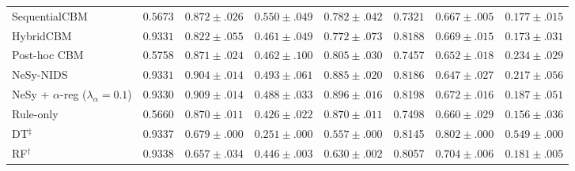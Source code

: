 \documentclass[journal]{IEEEtran}
\begin{document}
\begin{table}[!t]
\begin{tabular}{lccccccc}
SequentialCBM
  & $0.5673$ & $0.872{\pm}.026$ & $\mathbf{0.550{\pm}.049}$ & $0.782{\pm}.042$
  & $0.7321$ & $0.667{\pm}.005$ & $0.177{\pm}.015$ \\
HybridCBM
  & $0.9331$ & $0.822{\pm}.055$ & $0.461{\pm}.049$ & $0.772{\pm}.073$
  & $0.8188$ & $0.669{\pm}.015$ & $0.173{\pm}.031$ \\
Post-hoc CBM
  & 0.5758 & $0.871{\pm}.024$ & $0.462{\pm}.100$ & $0.805{\pm}.030$
  & 0.7457 & $0.652{\pm}.018$ & $0.234{\pm}.029$ \\
\midrule
NeSy-NIDS
  & $0.9331$ & $0.904{\pm}.014$ & $0.493{\pm}.061$ & $0.885{\pm}.020$
  & $0.8186$ & $0.647{\pm}.027$ & $0.217{\pm}.056$ \\
NeSy + $\alpha$-reg ($\lambda_\alpha{=}0.1$)
  & 0.9330 & $\mathbf{0.909{\pm}.014}$ & $0.488{\pm}.033$ & $\mathbf{0.896{\pm}.016}$
  & 0.8198 & $0.672{\pm}.016$ & $0.187{\pm}.051$ \\
Rule-only
  & 0.5660 & $0.870{\pm}.011$ & $0.426{\pm}.022$ & $0.870{\pm}.011$
  & 0.7498 & $0.660{\pm}.029$ & $0.156{\pm}.036$ \\
\midrule
DT$^\ddagger$
  & 0.9337 & $0.679{\pm}.000$ & $0.251{\pm}.000$ & $0.557{\pm}.000$
  & 0.8145 & $0.802{\pm}.000$ & $\mathbf{0.549{\pm}.000}$ \\
RF$^{\dagger}$
  & 0.9338 & $0.657{\pm}.034$ & $0.446{\pm}.003$ & $0.630{\pm}.002$
  & 0.8057 & $0.704{\pm}.006$ & $0.181{\pm}.005$ \\
\bottomrule
\end{tabular}
\end{table}
\end{document}
